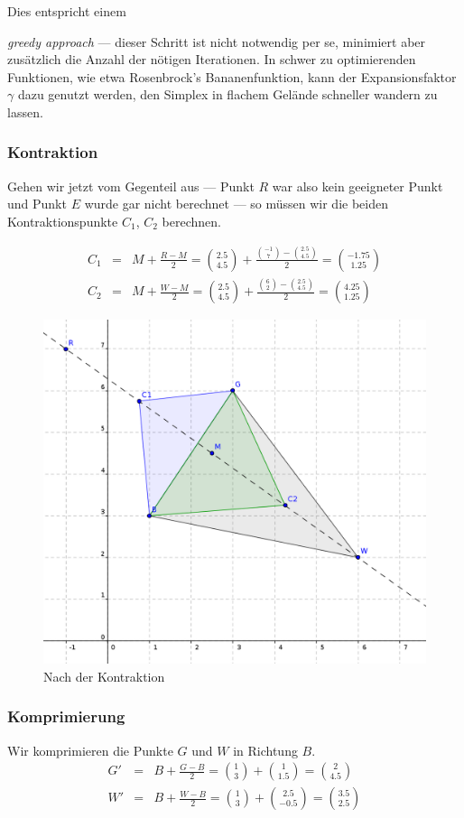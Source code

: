\documentclass[naustrian]{article}
\begin{document}
Dies entspricht einem {\emph{greedy approach} --- dieser
Schritt ist nicht notwendig per se, minimiert aber zusätzlich die Anzahl
der nötigen Iterationen. In schwer zu optimierenden Funktionen, wie etwa
Rosenbrock's Bananenfunktion, kann der Expansionsfaktor $\gamma$ dazu genutzt werden,
den Simplex in flachem Gelände schneller wandern zu lassen.

\subsubsection{Kontraktion}

Gehen wir jetzt vom Gegenteil aus --- Punkt $R$ war also
kein geeigneter Punkt und Punkt $E$ wurde gar nicht berechnet ---
so müssen wir die beiden Kontraktionspunkte $C_{1}$, $C_{2}$ berechnen.

\begin{eqnarray*}
    C_{1} & = & M+\frac{R-M}{2}=\binom{2.5}{4.5}+\frac{\binom{-1}{7}-\binom{2.5}{4.5}}{2}=\binom{-1.75}{1.25}\\
    C_{2} & = & M+\frac{W-M}{2}=\binom{2.5}{4.5}+\frac{\binom{6}{2}-\binom{2.5}{4.5}}{2}=\binom{4.25}{1.25}
\end{eqnarray*}

\begin{figure}[h]
    \centering
    \includegraphics[width=.5\textwidth]{nelder_mead/triangle_contract}
    \caption{Nach der Kontraktion}
\end{figure}

\subsubsection{Komprimierung}

Wir komprimieren die Punkte $G$ und $W$ in Richtung $B$.
\begin{eqnarray*}
    G' & = & B+\frac{G-B}{2}=\binom{1}{3}+\binom{1}{1.5}=\binom{2}{4.5}\\
    W' & = & B+\frac{W-B}{2}=\binom{1}{3}+\binom{2.5}{-0.5}=\binom{3.5}{2.5}
\end{eqnarray*}

}
\end{document}
